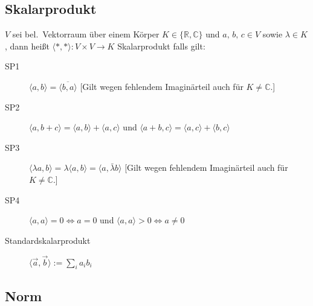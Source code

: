 \subsection{Skalarprodukt}
$V$ sei bel.~Vektorraum über einem Körper $K\in\{\mathbb{R},\mathbb{C}\}$ und $a,\, b,\, c\in V$ sowie $\lambda\in K$, dann heißt $\langle \ast,\ast \rangle : V\times V\to K$ Skalarprodukt falls gilt:
\begin{description}
  \item [{SP1}]
	$\langle a,b\rangle =\overline{\langle b,a\rangle}$
	[Gilt wegen fehlendem Imaginärteil auch für $K\ne\mathbb{C}$.]
  \item [{SP2}]
	$\langle a,b+c\rangle =\langle a,b\rangle +\langle a,c\rangle $
	und $\langle a+b,c\rangle =\langle a,c\rangle +\langle b,c\rangle $
  \item [{SP3}]
	$\langle \lambda a,b\rangle =\lambda\langle a,b\rangle =\langle a,\bar{\lambda}b\rangle $
	[Gilt wegen fehlendem Imaginärteil auch für $K\ne\mathbb{C}$.]
  \item [{SP4}]
	$\langle a,a \rangle = 0 \iff a=0$
	und $\langle a,a \rangle > 0 \iff a\ne0$
  \item [{Standardskalarprodukt}] $\langle \vec{a},\vec{b}\rangle :=\sum_{i} a_i b_i$
\end{description}

\subsection{\label{sub:Vektornorm}Norm}

